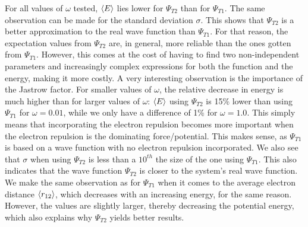 \documentclass[10pt,a4paper]{article}
\begin{document}
For all values of $\omega$ tested, $\braket{E}$ lies lower for $\Psi_{T2}$ than for $\Psi_{T1}$. The same observation can be made for the standard deviation $\sigma$. This shows that $\Psi_{T2}$ is a better approximation to the real wave function than $\Psi_{T1}$. For that reason, the expectation values from $\Psi_{T2}$ are, in general, more reliable than the ones gotten from $\Psi_{T1}$. However, this comes at the cost of having to find two non-independent parameters and increasingly complex expressions for both the function and the energy, making it more costly. 
A very interesting observation is the importance of the Jastrow factor. For smaller values of $\omega$, the relative decrease in energy is much higher than for larger values of  $\omega$: $\braket{E}$  using $\Psi_{T2}$ is 15\% lower than using $\Psi_{T1}$ for $\omega=0.01$, while we only have a difference of 1\% for $\omega=1.0$. This simply means that incorporating the electron repulsion becomes more important when the electron repulsion is the dominating force/potential. This makes sense, as $\Psi_{T1}$ is based on a wave function with no electron repulsion incorporated. We also see that $\sigma$ when using $\Psi_{T2}$ is less than a $10^{th}$ the size of the one using  $\Psi_{T1}$. This also indicates that the wave function $\Psi_{T2}$ is closer to the system's real wave function. \\
We make the same observation as for $\Psi_{T1}$ when it comes to the average electron distance $\braket{r_{12}}$, which decreases with an increasing energy, for the same reason. However, the values are slightly larger, thereby decreasing the potential energy, which also explains why $\Psi_{T2}$ yields better results.
\end{document}

